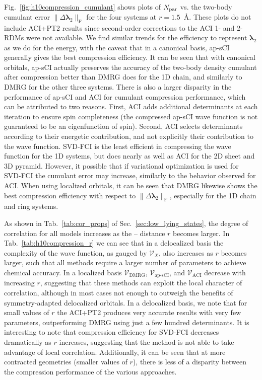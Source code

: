 \documentclass[aip,jcp,amsmath,amssymb, reprint]{revtex4-1}
\newcommand*{\ncomp}{\mathcal{V}_X}
\providecommand{\norm}[1]{\lVert#1\rVert}
\begin{document}
Fig.~\ref{fig:h10compression_cumulant} shows plots of $N_{\rm{par}}$ vs. the two-body cumulant error $\norm{\Delta\pmb{\lambda}_{2}}_\mathrm{F}$ for the four  systems at $r=1.5$~{\AA}.
These plots do not include ACI+PT2 results since second-order corrections to the ACI 1- and 2-RDMs were not available.
We find similar trends for the efficiency to represent $\pmb{\lambda}_{2}$ as we do for the energy, with the caveat that in a canonical basis, ap-sCI generally gives the best compression efficiency.
It can be seen that with canonical orbitals, ap-sCI actually preserves the accuracy of the two-body density cumulant after compression better than DMRG does for the 1D chain, and similarly to DMRG for the other three systems.
There is also a larger disparity in the performance of ap-sCI and ACI for cumulant compression performance, which can be attributed to two reasons. 
First, ACI adds additional determinants at each iteration to ensure spin completeness (the compressed ap-sCI wave function is not guaranteed to be an eigenfunction of spin). 
Second, ACI selects determinants according to their energetic contribution, and not explicitly their contribution to the wave function.
SVD-FCI is the least efficient in compressing the wave function for the 1D systems, but does nearly as well as ACI for the 2D sheet and 3D pyramid.
However, it possible that if variational optimization is used for SVD-FCI the cumulant error may increase, similarly to the behavior observed for ACI.
When using localized orbitals, it can be seen that DMRG likewise shows the best compression efficiency with respect to $\norm{\Delta\pmb{\lambda}_{2}}_\mathrm{F}$, especially for the 1D chain and ring systems.

As shown in Tab.~\ref{tab:cor_props} of Sec.~\ref{sec:low_lying_states}, the degree of correlation for all models increases as the --  distance $r$ becomes larger. 
In Tab.~\ref{tab:h10compression_r} we can see that in a delocalized basis the complexity of the wave function, as gauged by $\ncomp$, also increases as $r$ becomes larger, such that all methods require a larger number of parameters to achieve chemical accuracy.
In a localized basis $\mathcal{V}_{\text{DMRG}}$, $\mathcal{V}_{\text{ap-sCI}}$, and $\mathcal{V}_{\text{ACI}}$ decrease with increasing $r$, suggesting that these methods can exploit the local character of correlation, although in most cases not enough to outweigh the benefits of symmetry-adapted delocalized orbitals.
In a delocalized basis, we note that for small values of $r$ the ACI+PT2 produces very accurate results with very few parameters, outperforming DMRG using just a few hundred determinants.
It is interesting to note that compression efficiency for SVD-FCI decreases dramatically as $r$ increases, suggesting that the method is not able to take advantage of local correlation.  
Additionally, it can be seen that at more contracted geometries (smaller values of $r$), there is less of a disparity between the compression performance of the various approaches.
\end{document}
